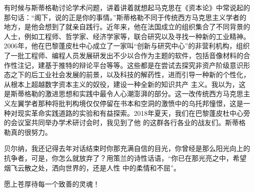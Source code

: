 \documentclass{article}
\begin{document}
有时候与斯蒂格勒讨论学术问题，讲着讲着就想起马克思在《资本论》中常说起的那句话：“阁下，说的正是你的事情。”斯蒂格勒不同于传统西方马克思主义学者的地方，是他会想到了就亲自践行。近年来，他在法国成立的组织集合了不同背景的人士，例如工程师、哲学家、经济学家等，联合研究以及寻找一种新的工业精神。2006年，他在巴黎蓬皮杜中心成立了一家叫“创新与研究中心”的非营利机构，组织了一批工程师、编程人员发展研发出不少以合作为主题的软件，包括音像材料的合作性注记，建基于推特的辩论平台等等。这些都是在尝试去探究非资产阶级意识形态之下的后工业社会发展的前景，以及科技的解药性，进而引导一种新的个性化，从根本上超越数字资本主义的奴役，建设一种全新的知识共产
\newpage
主义。我以为，这是斯蒂格勒的激进思想和实践中最令人心潮澎湃的部分。这一改传统西方马克思主义左翼学者那种将批判构境仅仅停留在书本和空洞的激愤中的乌托邦憧憬，这是一种对现实革命实践道路的实验和有益探索。2018年夏天，我们在巴黎蓬皮杜中心旁的会议室共同举办学术研讨会时，我见到了他
的这群各行各业的战友们。斯蒂格勒真的很努力。 

贝尔纳，我还记得去年对话结束时你那充满自信的目光，你曾经是那么阳光向上的抗争者，可是，你怎么就放弃了？用策兰的诗性话语，“你已在那光亮之中，希望烟飞云散之处，洒向世界的，还是人性
中的柔情和不屈”。 \par 愿上苍厚待每一个致善的灵魂！
\end{document}
